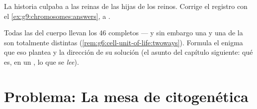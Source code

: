\begin{exercise}[$\star\star$]\label{exo:g9:chromosomes:11}
La historia culpaba a las reinas de las hijas de los reinos. Corrige el
registro con el \cref{ex:g9:chromosomes:answers},  a .
\end{exercise}

\begin{exercise}[$\star\star\star$]\label{exo:g9:chromosomes:12}
Todas las  del cuerpo llevan los 46 completos --- y sin embargo
una  y una  de la  son totalmente distintas
(\cref{rem:g6:cell-unit-of-life:twoways}). Formula el enigma que eso
plantea y la dirección de su solución (el asunto del capítulo
siguiente: qué es, en un , lo que se \emph{lee}).
\end{exercise}

\section{Problema: La mesa de citogenética}


